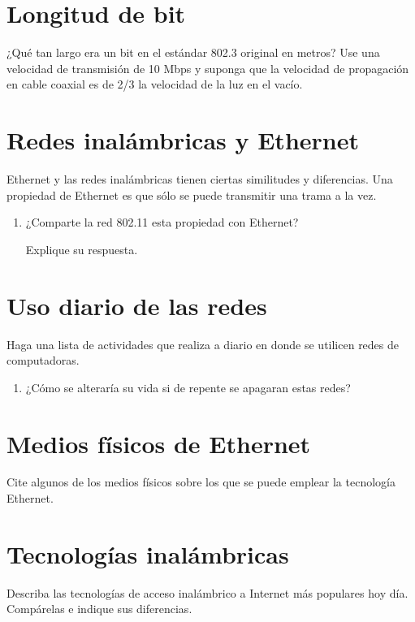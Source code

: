 \documentclass[12pt]{report}
\begin{document}
\section{Longitud de bit \sthree}
¿Qué tan largo era un bit en el estándar 802.3 original en metros? Use una velocidad de transmisión de 10 Mbps y suponga que la velocidad de propagación en cable coaxial es de 2/3 la velocidad de la luz en el vacío.


\section{Redes inalámbricas y Ethernet \sone \steo}
Ethernet y las redes inalámbricas tienen ciertas similitudes y diferencias. Una propiedad de Ethernet es que sólo se puede transmitir una trama a la vez.
\begin{enumerate}
	\item ¿Comparte la red 802.11 esta propiedad con Ethernet?

	      Explique su respuesta.
\end{enumerate}

\section{Uso diario de las redes \sone \steo}
Haga una lista de actividades que realiza a diario en donde se utilicen redes de computadoras.
\begin{enumerate}
	\item ¿Cómo se alteraría su vida si de repente se apagaran estas redes?
\end{enumerate}

\section{Medios físicos de Ethernet \sone \steo}
Cite algunos de los medios físicos sobre los que se puede emplear la tecnología Ethernet.

\section{Tecnologías inalámbricas \sone \steo}
Describa las tecnologías de acceso inalámbrico a Internet más populares hoy día. Compárelas e indique sus diferencias.
\end{document}
